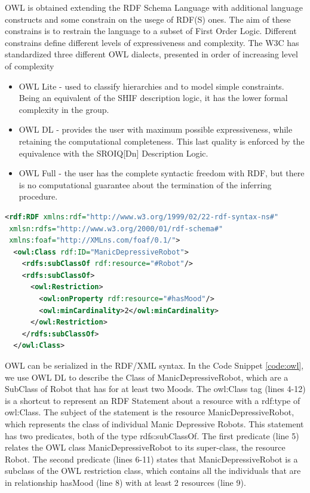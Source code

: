 OWL is obtained extending the RDF Schema Language with additional language constructs and some constrain on the usege of RDF(S)  ones. The aim of these constrains is to restrain the language to a subset of First Order Logic. Different constrains define different levels of expressiveness and complexity. The W3C has standardized three different OWL dialects, presented in order of increasing level of complexity
\begin{itemize}
\item OWL Lite - used to classify hierarchies and to model simple constraints. Being an equivalent of the SHIF description logic, it has the lower formal complexity in the group.
\item OWL DL - provides the user with maximum possible expressiveness, while retaining the computational completeness. This last quality is enforced by the equivalence with the SROIQ[Dn] Description Logic.
\item OWL Full - the user has the complete syntactic freedom with RDF, but there is no computational guarantee about the termination of the inferring procedure.
\end{itemize}

\begin{lstlisting}[language=XML, caption=An example of a simple OWL DL RDF/XML document:, label=code:owl]
<rdf:RDF xmlns:rdf="http://www.w3.org/1999/02/22-rdf-syntax-ns#"
 xmlsn:rdfs="http://www.w3.org/2000/01/rdf-schema#"
 xmlns:foaf="http://XMLns.com/foaf/0.1/">
  <owl:Class rdf:ID="ManicDepressiveRobot">
    <rdfs:subClassOf rdf:resource="#Robot"/>
    <rdfs:subClassOf>
      <owl:Restriction>
        <owl:onProperty rdf:resource="#hasMood"/>
        <owl:minCardinality>2</owl:minCardinality>
      </owl:Restriction>
    </rdfs:subClassOf>
  </owl:Class>
\end{lstlisting}

OWL can be serialized in the RDF/XML syntax. In the Code Snippet \ref{code:owl}, we use OWL DL to describe the Class of ManicDepressiveRobot, which are a SubClass of Robot that has for at least two Moods. The owl:Class tag (lines 4-12) is a shortcut to represent an RDF Statement about a resource with a rdf:type of owl:Class. The subject of the statement is the resource ManicDepressiveRobot, which represents the class of individual Manic Depressive Robots. This statement has two predicates, both of the type rdfs:subClassOf. The first predicate (line 5) relates the OWL class ManicDepressiveRobot to its super-class, the resource Robot. The second predicate (lines 6-11) states that ManicDepressiveRobot is a subclass of the OWL restriction class, which contains all the individuals that are in relationship hasMood (line 8) with at least 2 resources (line 9).



